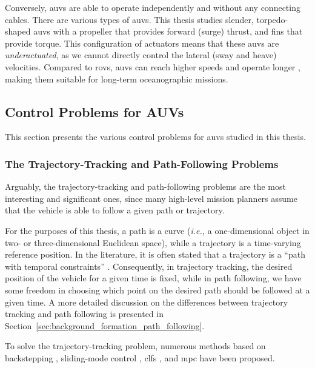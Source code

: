 Conversely, \glspl{auv} are able to operate independently and without any connecting cables.
There are various types of \glspl{auv}.
This thesis studies slender, torpedo-shaped \glspl{auv} with a propeller that provides forward (surge) thrust, and fins that provide torque.
This configuration of actuators means that these \glspl{auv} are \emph{underactuated}, as we cannot directly control the lateral (sway and heave) velocities.
Compared to \glspl{rov}, \glspl{auv} can reach higher speeds and operate longer \cite{sousa_LAUV_2012,purcell_remus_2000}, making them suitable for long-term oceanographic missions.

\subsection{Control Problems for AUVs}

This section presents the various control problems for \glspl{auv} studied in this thesis.

\subsubsection{The Trajectory-Tracking and Path-Following Problems}

Arguably, the trajectory-tracking and path-following problems are the most interesting and significant ones,
since many high-level mission planners assume that the vehicle is able to follow a given path or trajectory.

For the purposes of this thesis, a path is a curve (\emph{i.e.,} a one-dimensional object in two- or three-dimensional Euclidean space), while a trajectory is a time-varying reference position.
In the literature, it is often stated that a trajectory is a ``path with temporal constraints'' \cite{paliotta_trajectory_2019}.
Consequently, in trajectory tracking, the desired position of the vehicle for a given time is fixed, while in path following, we have some freedom in choosing which point on the desired path should be followed at a given time.
A more detailed discussion on the differences between trajectory tracking and path following is presented in Section~\ref{sec:background_formation_path_following}.

To solve the trajectory-tracking problem, numerous methods based on backstepping \cite{rezazadegan_trajectory-tracking-backstepping_2015,alonge_trajectory-tracking-backstepping_2001}, sliding-mode control \cite{elmokadem_trajectory-tracking-SMC_2016}, \glspl{clf} \cite{aguiar_trajectory-tracking-CLF_2007}, and \gls{mpc} \cite{abdelaal_trajectory-tracking-MPC_2015} have been proposed. 

